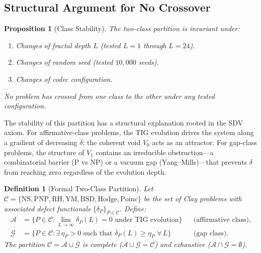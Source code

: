 \documentclass[11pt]{article}
\newtheorem{proposition}[theorem]{Proposition}
\newtheorem{definition}[theorem]{Definition}
\begin{document}
\subsection{Structural Argument for No Crossover}
\label{subsec:no-crossover}

\begin{proposition}[Class Stability]
\label{prop:stability}
The two-class partition is invariant under:
\begin{enumerate}
\item Changes of fractal depth $L$ (tested $L = 1$ through $L = 24$).
\item Changes of random seed (tested $10{,}000$ seeds).
\item Changes of codec configuration.
\end{enumerate}
No problem has crossed from one class to the other under any tested
configuration.
\end{proposition}

The stability of this partition has a structural explanation rooted in
the SDV axiom.  For affirmative-class problems, the TIG evolution
drives the system along a gradient of decreasing $\delta$; the
coherent void $V_0$ acts as an attractor.  For gap-class problems,
the structure of $V_1$ contains an irreducible obstruction---a
combinatorial barrier (P vs NP) or a vacuum gap (Yang--Mills)---that
prevents $\delta$ from reaching zero regardless of the evolution depth.

\begin{definition}[Formal Two-Class Partition]
\label{def:formal-partition}
Let $\mathcal{C} = \{\mathrm{NS}, \mathrm{PNP}, \mathrm{RH},
\mathrm{YM}, \mathrm{BSD}, \mathrm{Hodge}, \mathrm{Poinc}\}$ be the
set of Clay problems with associated defect functionals
$\{\delta_P\}_{P \in \mathcal{C}}$.  Define:
\begin{align*}
\mathcal{A} &= \{P \in \mathcal{C} : \lim_{L \to \infty}
  \delta_P(L) = 0 \text{ under TIG evolution}\}
  &&\text{(affirmative class)}, \\
\mathcal{G} &= \{P \in \mathcal{C} : \exists\, \eta_P > 0
  \text{ such that } \delta_P(L) \geq \eta_P \;\forall\, L\}
  &&\text{(gap class)}.
\end{align*}
The partition $\mathcal{C} = \mathcal{A} \sqcup \mathcal{G}$ is
\emph{complete} ($\mathcal{A} \cup \mathcal{G} = \mathcal{C}$) and
\emph{exhaustive} ($\mathcal{A} \cap \mathcal{G} = \emptyset$).
\end{definition}
\end{document}

